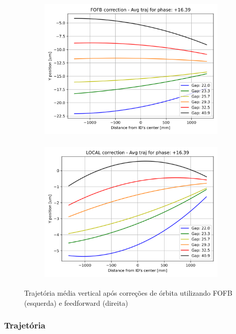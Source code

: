 \documentclass[a4paper,12pt]{article}
\begin{document}
\begin{figure}[H]
\begin{subfigure}{0.5\textwidth}
\includegraphics[width=0.9\linewidth, height=7cm]{figs/phase16 vertical-avg-traj-FOFB.png} 
\label{fig:subim10yc16}
\end{subfigure}
\begin{subfigure}{0.5\textwidth}
\includegraphics[width=0.9\linewidth, height=7cm]{figs/phase16 vertical-avg-traj-LOCAL.png}
\label{fig:subim20yc16}
\end{subfigure}
\caption{Trajetória média vertical após correções de órbita utilizando FOFB (esquerda) e feedforward (direita)}
\label{fig:16corry}
\end{figure}



\subsubsection{Trajetória}
\end{document}
